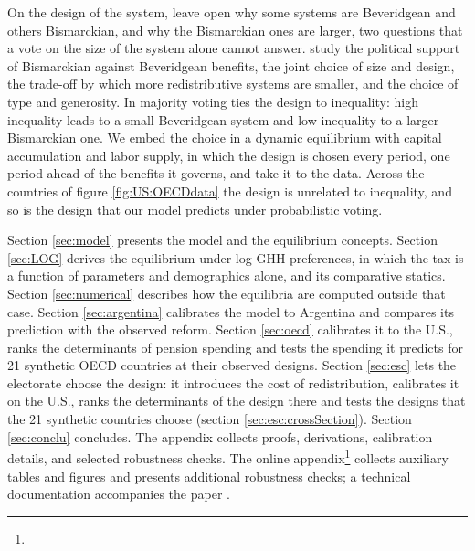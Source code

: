 On the design of the system, \textcite{GalassoP02a1} leave open why some systems are Beveridgean and others Bismarckian, and why the Bismarckian ones are larger, two questions that a vote on the size of the system alone cannot answer. \textcite{Casamattaa1} study the political support of Bismarckian against Beveridgean benefits, \textcite{CondeRuizP07a1} the joint choice of size and design, \textcite{KoethenbuergerPP08a1} the trade-off by which more redistributive systems are smaller, and \textcite{CremerDMP07a1} the choice of type and generosity. In \textcite{CondeRuizP07a1} majority voting ties the design to inequality: high inequality leads to a small Beveridgean system and low inequality to a larger Bismarckian one. We embed the choice in a dynamic equilibrium with capital accumulation and labor supply, in which the design is chosen every period, one period ahead of the benefits it governs, and take it to the data. Across the countries of figure \ref{fig:US:OECDdata} the design is unrelated to inequality, and so is the design that our model predicts under probabilistic voting.

Section \ref{sec:model} presents the model and the equilibrium concepts. Section \ref{sec:LOG} derives the equilibrium under log-GHH preferences, in which the tax is a function of parameters and demographics alone, and its comparative statics. Section \ref{sec:numerical} describes how the equilibria are computed outside that case. Section \ref{sec:argentina} calibrates the model to Argentina and compares its prediction with the observed reform. Section \ref{sec:oecd} calibrates it to the U.S., ranks the determinants of pension spending and tests the spending it predicts for 21 synthetic OECD countries at their observed designs. Section \ref{sec:esc} lets the electorate choose the design: it introduces the cost of redistribution, calibrates it on the U.S., ranks the determinants of the design there and tests the designs that the 21 synthetic countries choose (section \ref{sec:esc:crossSection}). Section \ref{sec:conclu} concludes. The appendix collects proofs, derivations, calibration details, and selected robustness checks. The online appendix\footnote{\oahome} collects auxiliary tables and figures and presents additional robustness checks; a technical documentation accompanies the paper \parencite{BergGE26doc}.